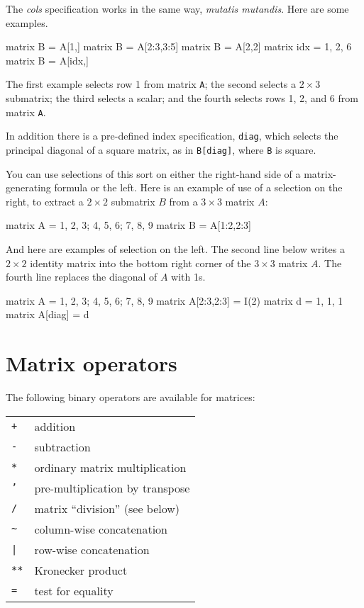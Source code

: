 The \textsl{cols} specification works in the same way, \textit{mutatis
  mutandis}.  Here are some examples.
%
\begin{code}
matrix B = A[1,]
matrix B = A[2:3,3:5]
matrix B = A[2,2]
matrix idx = { 1, 2, 6 }
matrix B = A[idx,]
\end{code}
%
The first example selects row 1 from matrix \texttt{A}; the second
selects a $2\times 3$ submatrix; the third selects a scalar; and
the fourth selects rows 1, 2, and 6 from matrix \texttt{A}.

In addition there is a pre-defined index specification, \texttt{diag},
which selects the principal diagonal of a square matrix, as in
\texttt{B[diag]}, where \texttt{B} is square.

You can use selections of this sort on either the right-hand side of
a matrix-generating formula or the left.  Here is an example of use of
a selection on the right, to extract a $2\times 2$ submatrix $B$ from a
$3\times 3$ matrix $A$:
%
\begin{code}
matrix A = { 1, 2, 3; 4, 5, 6; 7, 8, 9 }
matrix B = A[1:2,2:3]
\end{code}
%
And here are examples of selection on the left.  The second line below
writes a $2\times 2$ identity matrix into the bottom right corner of the
$3\times 3$ matrix $A$.  The fourth line replaces the diagonal of $A$ 
with 1s.
%
\begin{code}
matrix A = { 1, 2, 3; 4, 5, 6; 7, 8, 9 }
matrix A[2:3,2:3] = I(2)
matrix d = { 1, 1, 1 }
matrix A[diag] = d
\end{code}

\section{Matrix operators}
\label{matrix-op}

The following binary operators are available for matrices:

\begin{center}
\begin{tabular}{ll}
\texttt{+}  & addition \\
\texttt{-}  & subtraction \\
\texttt{*}  & ordinary matrix multiplication \\
\texttt{'}  & pre-multiplication by transpose \\
\texttt{/}  & matrix ``division'' (see below) \\
\verb+~+    & column-wise concatenation \\
\verb+|+    & row-wise concatenation \\
\texttt{**} & Kronecker product \\
\texttt{=}  & test for equality 
\end{tabular}
\end{center}

